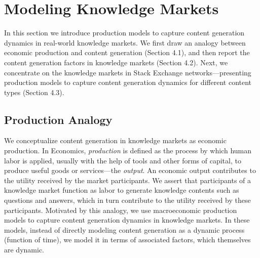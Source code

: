 \section{Modeling Knowledge Markets}
In this section we introduce production models to capture content generation dynamics in real-world knowledge markets. We first draw an analogy between economic production and content generation (Section 4.1), and then report the content generation factors in knowledge markets (Section 4.2). Next, we concentrate on the knowledge markets in Stack Exchange networks---presenting production models to capture content generation dynamics for different content types (Section 4.3).

\subsection{Production Analogy} 
We conceptualize content generation in knowledge markets as economic production. In Economics, \emph{production} is defined as the process by which human labor is applied, usually with the help of tools and other forms of capital, to produce useful goods or services---the \emph{output}. An economic output contributes to the utility received by the market participants. We assert that participants of a knowledge market function as labor to generate knowledge contents such as questions and answers, which in turn contribute to the utility received by these participants. Motivated by this analogy, we use macroeconomic production models to capture content generation dynamics in knowledge markets. In these models, instead of directly modeling content generation as a dynamic process (function of time), we model it in terms of associated factors, which themselves are dynamic.



